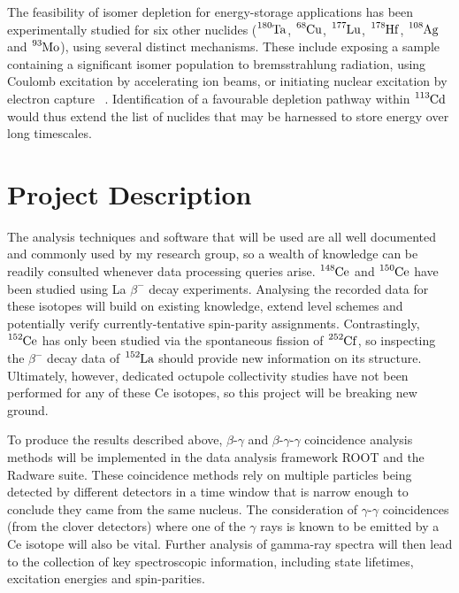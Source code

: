 \documentclass[12pt,a4paper]{article}
\begin{document}
\medskip
\noindent
The feasibility of isomer depletion for energy-storage applications has been experimentally studied for six other nuclides ($\ce{^{180}Ta}$, $\ce{^{68}Cu}$, $\ce{^{177}Lu}$, $\ce{^{178}Hf}$, $\ce{^{108}Ag}$ and $\ce{^{93}Mo}$), using several distinct mechanisms.
These include exposing a sample containing a significant isomer population to bremsstrahlung radiation, using Coulomb excitation by accelerating ion beams, or initiating nuclear excitation by electron capture
~\cite{shaffer_innovations_2018}.
Identification of a favourable depletion pathway within $\ce{^{113}Cd}$ would thus extend the list of nuclides that may be harnessed to store energy over long timescales.

\section*{Project Description}

\medskip
\noindent
The analysis techniques and software that will be used are all well documented and commonly used by my research group, so a wealth of knowledge can be readily consulted whenever data processing queries arise.
$\ce{^{148}Ce}$ and $\ce{^{150}Ce}$ have been studied using La $\beta^-$ decay experiments.
Analysing the recorded data for these isotopes will build on existing knowledge, extend level schemes and potentially verify currently-tentative spin-parity assignments.
Contrastingly, $\ce{^{152}Ce}$ has only been studied via the spontaneous fission of $\ce{^{252}Cf}$, so inspecting the $\beta^-$ decay data of $\ce{^{152}La}$ should provide new information on its structure.
Ultimately, however, dedicated octupole collectivity studies have not been performed for any of these Ce isotopes, so this project will be breaking new ground.

\medskip
\noindent
To produce the results described above, $\beta$-$\gamma$ and $\beta$-$\gamma$-$\gamma$ coincidence analysis methods will be implemented in the data analysis framework ROOT and the Radware suite.
These coincidence methods rely on multiple particles being detected by different detectors in a time window that is narrow enough to conclude they came from the same nucleus.
The consideration of $\gamma$-$\gamma$ coincidences (from the clover detectors) where one of the $\gamma$ rays is known to be emitted by a Ce isotope will also be vital.
Further analysis of gamma-ray spectra will then lead to the collection of key spectroscopic information, including state lifetimes, excitation energies and spin-parities. %
\end{document}
